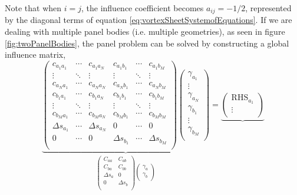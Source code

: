 Note that when $i=j$, the influence coefficient becomes $a_{ij} = -1/2$, represented by the diagonal terms of equation \ref{eq:vortexSheetSystemofEquations}. If we are dealing with multiple panel bodies (i.e. multiple geometries), as seen in figure \ref{fig:twoPanelBodies}, the panel problem can be solved by constructing a global influence matrix, 
	\begin{equation}
	\underbrace{\begin{pmatrix}
		c_{a_1a_1} & \cdots & c_{a_1a_N} & c_{a_1b_1} &\cdots & c_{a_1b_M}\\
		\vdots & \ddots & \vdots & \vdots &\ddots & \vdots\\
		c_{a_Na_1} & \cdots & c_{a_Na_N} & c_{a_Nb_1} &\cdots & c_{a_Nb_M}\\
		c_{b_1a_1} & \cdots & c_{b_1a_N} & c_{b_1b_1} &\cdots & c_{b_1b_M}\\
		\vdots & \ddots & \vdots & \vdots &\ddots & \vdots\\
		c_{b_Ma_1} & \cdots & c_{b_Ma_N} & c_{b_Mb_1} &\cdots & c_{b_Mb_M}\\
		\Delta s_{a_1} & \cdots & \Delta s_{a_N} & 0 & \cdots & 0\\
		0 & \cdots & 0 & \Delta s_{b_1} & \cdots & \Delta s_{b_M}\\
	\end{pmatrix}
	\begin{pmatrix}
		\gamma_{a_1}\\
		\vdots\\
		\gamma_{a_N}\\
		\gamma_{b_1}\\
		\vdots\\
		\gamma_{b_M}\\
	\end{pmatrix}}_{\begin{pmatrix}
						C_{aa} & C_{ab} \\
						C_{ba} & C_{bb} \\
						\Delta s_a & 0\\
						0 & \Delta s_b \\
					\end{pmatrix} \begin{pmatrix}
								\gamma_{a}\\
								\gamma_{b}\\
							\end{pmatrix}} 
	= 
	\underbrace{\begin{pmatrix}
		\mathrm{RHS}_{a_1}\\
		\vdots\\

\end{pmatrix}}
\end{equation}
